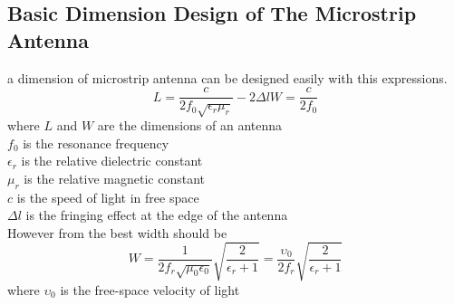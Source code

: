 \documentclass[11pt,a4paper]{article}
\begin{document}
    \subsection{Basic Dimension Design of The Microstrip Antenna}
      \indent a dimension of microstrip antenna can be designed easily with this expressions\cite{NoK:05}.
      \begin{equation}
        L = \frac{c}{2f_0\sqrt{\epsilon_r\mu_r}} - 2\Delta l 
        W = \frac{c}{2f_0}
      \end{equation}
      \indent where $L$ and $W$ are the dimensions of an antenna\\[1ex]
      \indent $f_0$ is the resonance frequency\\[1ex]
      \indent $\epsilon_r$ is the relative dielectric constant\\[1ex]
      \indent $\mu_r$ is the relative magnetic constant\\[1ex]
      \indent $c$ is the speed of light in free space\\[1ex]
      \indent $\Delta l$ is the fringing effect at the edge of the antenna\\[3ex]
      \indent However from \cite{CoB:05} the best width should be
      \begin{equation}
        W = \frac {1} {2 f_r \sqrt{\mu_{0} \epsilon_{0}}}\sqrt{\frac{2}{\epsilon_{r} + 1}} = \frac{\upsilon_{0}}{2f_{r}}\sqrt{\frac{2}{\epsilon_{r} + 1}}
      \end{equation}
      \indent where $\upsilon_{0}$ is the free-space velocity of light
    
  \newpage
\end{document}
